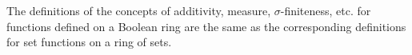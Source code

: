 The definitions of the concepts of additivity, measure, $\sigma$-finiteness, etc. for functions defined on a Boolean ring are the same as the corresponding definitions for set functions on a ring of sets.
